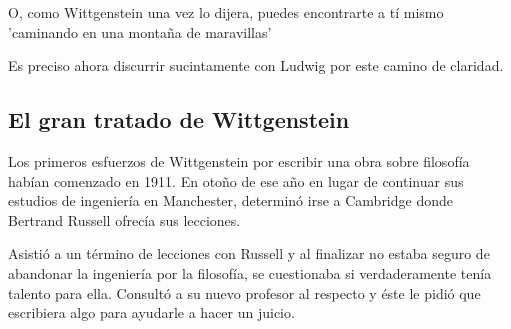 O, como Wittgenstein una vez lo dijera, puedes encontrarte a tí mismo 'caminando
en una montaña de maravillas'




Es preciso ahora discurrir sucintamente con Ludwig por este camino de
claridad.

\subsection{El gran tratado de Wittgenstein}



Los primeros esfuerzos de Wittgenstein por escribir una obra sobre filosofía
habían comenzado en 1911. En otoño de ese año en lugar de continuar sus estudios
de ingeniería en Manchester, determinó irse a Cambridge donde Bertrand Russell
ofrecía sus lecciones.

Asistió a un término de lecciones con Russell y al finalizar no estaba seguro de
abandonar la ingeniería por la filosofía, se cuestionaba si verdaderamente tenía
talento para ella. Consultó a su nuevo profesor al respecto y éste le pidió que
escribiera algo para ayudarle a hacer un juicio.

